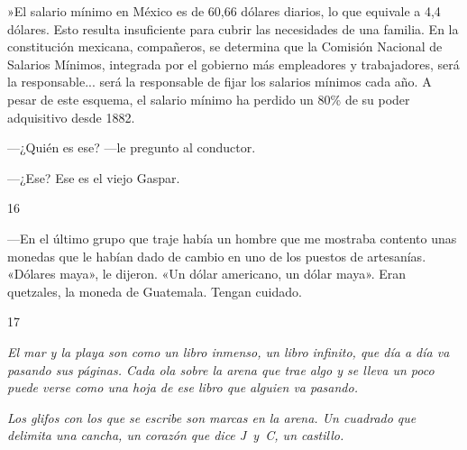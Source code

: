 \documentclass[12pt,twoside,openright,a5paper]{book}
\begin{document}
»El salario mínimo en México es de 60,66 dólares diarios, lo que equivale
a 4,4 dólares. Esto resulta insuficiente para cubrir las necesidades de una
familia. En la constitución mexicana, compañeros, se determina que la 
Comisión Nacional de Salarios
Mínimos, integrada por el gobierno más empleadores y trabajadores, será la
responsable... será la responsable de fijar los salarios mínimos cada
año. A pesar de este esquema, el salario mínimo ha perdido un 80\% de su
poder adquisitivo desde 1882.

---¿Quién es ese? ---le pregunto al conductor.

---¿Ese? Ese es el viejo Gaspar.


\vspace{0.5cm}

\hrulefill \hspace{0.1cm}\decofourleft\hspace{0.2cm} 16 \hspace{0.2cm}\decofourright \hspace{0.1cm}\hrulefill

\nopagebreak

\vspace{0.5cm}

\nopagebreak

---En el último grupo que traje había un hombre que me mostraba contento
unas monedas que le habían dado de cambio en uno de los puestos de
artesanías. «Dólares maya», le dijeron. «Un dólar americano, un dólar maya». Eran
quetzales, la moneda de Guatemala. Tengan cuidado.

\vspace{0.5cm}

\hrulefill \hspace{0.1cm}\decofourleft\hspace{0.2cm} 17 \hspace{0.2cm}\decofourright \hspace{0.1cm}\hrulefill

\nopagebreak

\vspace{0.5cm}

\nopagebreak

\emph{El mar y la playa son como un libro inmenso, un libro infinito, que día
a día va pasando sus páginas. Cada ola sobre la arena que trae algo y se
lleva un poco puede verse como una hoja de ese libro que alguien va pasando.}

\emph{Los glifos con los que se escribe son marcas en la arena. Un cuadrado que
delimita una cancha, un corazón que dice \mbox{J y C}, un castillo.}
\end{document}

